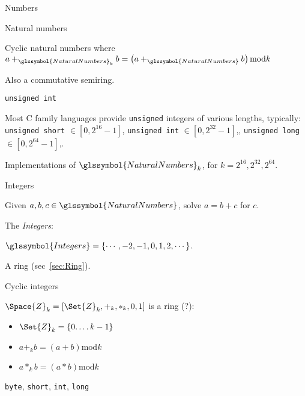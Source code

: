 \begin{plSection}{Numbers}
\begin{plSection}{Natural numbers}
\begin{plSection}{Cyclic natural numbers}
where
$a +_{\glssymbol{NaturalNumbers}_{k}} b =
\left( a +_{\glssymbol{NaturalNumbers}} b \right) \text{mod} k$

Also a commutative semiring.

\end{plSection}%
\begin{plSection}{\texttt{unsigned int}}
\label{sec:unsigned-int}

Most C family languages provide \texttt{unsigned} integers
of various lengths, typically: 
\texttt{unsigned short} $\in \left[ 0, 2^{16} - 1 \right]$,
\texttt{unsigned int} $\in \left[ 0, 2^{32} - 1 \right]$,,
\texttt{unsigned long} $\in \left[ 0, 2^{64} - 1 \right]$,.

Implementations of $\glssymbol{NaturalNumbers}_{k}$,
for $k = 2^{16}, 2^{32}, 2^{64}$.

\end{plSection}%
\end{plSection}%
\begin{plSection}{Integers}
\label{sec:Integers}

Given $a,b,c \in \glssymbol{NaturalNumbers}$,
solve $a = b + c$ for $c$.

The \textit{\gls{Integers}}: 

$\glssymbol{Integers} = \{\cdots, -2, -1, 0, 1, 2, \cdots\}$.

A ring (sec~\ref{sec:Ring}).
\begin{plSection}{Cyclic integers}
\label{sec:Cyclic-integers}

$\Space{Z}_{k} = \left[ \Set{Z}_{k}, +_k, *_k, 0, 1 \right]$
is a ring (?):
\begin{itemize}
  \item $\Set{Z}_{k} = \left\{ 0. \ldots k-1  \right\}$
  \item $ a +_k b = \left( a + b \right) \text{mod} k$
  \item $ a *_k b = \left( a * b \right) \text{mod} k$
\end{itemize}

\end{plSection}%
\begin{plSection}{\texttt{byte}, \texttt{short}, \texttt{int},
 \texttt{long}}
\label{sec:int}


\end{plSection}
\end{plSection}
\end{plSection}
